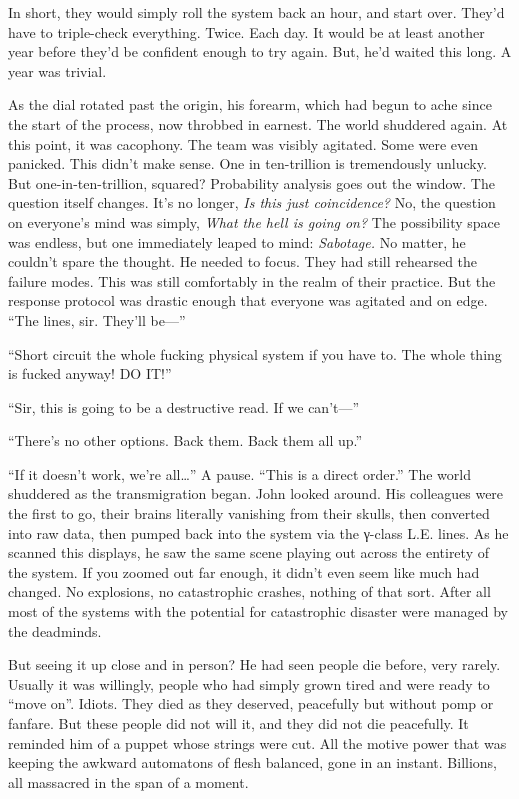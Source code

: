 In short, they would simply roll the system back an hour, and start over. They’d have to triple-check everything. Twice. Each day. It would be at least another year before they’d be confident enough to try again. But, he’d waited this long. A year was trivial.

As the dial rotated past the origin, his forearm, which had begun to ache since the start of the process, now throbbed in earnest.
\simpleline
The world shuddered again.
\simpleline
At this point, it was cacophony. The team was visibly agitated. Some were even panicked. This didn’t make sense.
\SmallVSpace
One in ten-trillion is tremendously unlucky. But one-in-ten-trillion, squared? Probability analysis goes out the window. The question itself changes. It’s no longer, \emph{Is this just coincidence?} No, the question on everyone’s mind was simply, \emph{What the hell is going on?}  The possibility space was endless, but one immediately leaped to mind: \emph{Sabotage.} No matter, he couldn’t spare the thought. He needed to focus. They had still rehearsed the failure modes. This was still comfortably in the realm of their practice.  But the response protocol was drastic enough that everyone was agitated and on edge.
\SmallVSpace
“The lines, sir. They’ll be\mbox{---}”

“Short circuit the whole fucking physical system if you have to. The whole thing is fucked anyway! DO IT!”

“Sir, this is going to be a destructive read. If we can’t\mbox{---}”

“There’s no other options. Back them. Back them all up.”

“If it doesn’t work, we’re all…”
\SmallVSpace
A pause.
\SmallVSpace
“This is a direct order.”
\simpleline
The world shuddered as the transmigration began.
\SomeVSpace
John looked around. His colleagues were the first to go, their brains literally vanishing from their skulls, then converted into raw data, then pumped back into the system via the γ-class L.E. lines. As he scanned this displays, he saw the same scene playing out across the entirety of the system. If you zoomed out far enough, it didn’t even seem like much had changed. No explosions, no catastrophic crashes, nothing of that sort. After all most of the systems with the potential for catastrophic disaster were managed by the deadminds.

But seeing it up close and in person? He had seen people die before, very rarely. Usually it was willingly, people who had simply grown tired and were ready to “move on”. Idiots. They died as they deserved, peacefully but without pomp or fanfare. But these people did not will it, and they did not die peacefully. It reminded him of a puppet whose strings were cut. All the motive power that was keeping the awkward automatons of flesh balanced, gone in an instant. Billions, all massacred in the span of a moment.

